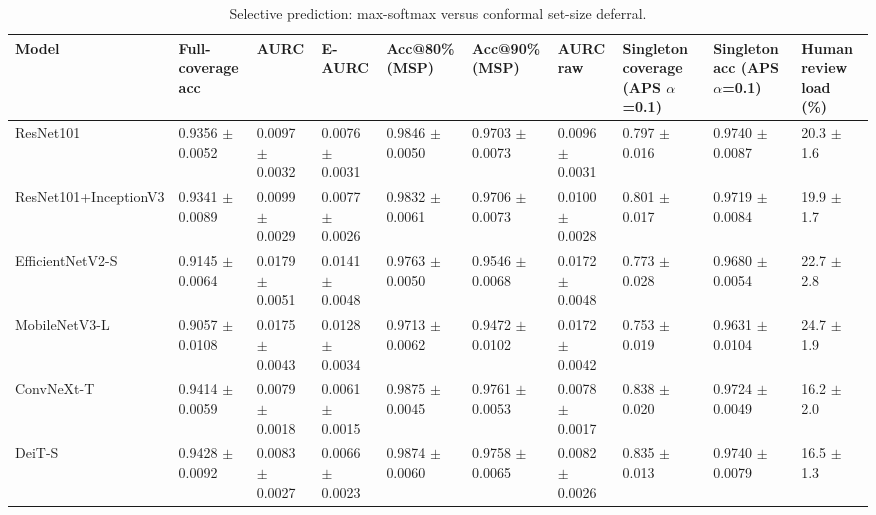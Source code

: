 \begin{table}[ht]
\centering
\small
\caption{Selective prediction: max-softmax versus conformal set-size deferral.}
\label{tab:tab6_selective_prediction}
\begin{tabular}{llllllllll}
\hline
Model & Full-coverage acc & AURC & E-AURC & Acc@80\% (MSP) & Acc@90\% (MSP) & AURC raw & Singleton coverage (APS $\alpha$=0.1) & Singleton acc (APS $\alpha$=0.1) & Human review load (\%) \\
\hline
ResNet101 & 0.9356 $\pm$ 0.0052 & 0.0097 $\pm$ 0.0032 & 0.0076 $\pm$ 0.0031 & 0.9846 $\pm$ 0.0050 & 0.9703 $\pm$ 0.0073 & 0.0096 $\pm$ 0.0031 & 0.797 $\pm$ 0.016 & 0.9740 $\pm$ 0.0087 & 20.3 $\pm$ 1.6 \\
ResNet101+InceptionV3 & 0.9341 $\pm$ 0.0089 & 0.0099 $\pm$ 0.0029 & 0.0077 $\pm$ 0.0026 & 0.9832 $\pm$ 0.0061 & 0.9706 $\pm$ 0.0073 & 0.0100 $\pm$ 0.0028 & 0.801 $\pm$ 0.017 & 0.9719 $\pm$ 0.0084 & 19.9 $\pm$ 1.7 \\
EfficientNetV2-S & 0.9145 $\pm$ 0.0064 & 0.0179 $\pm$ 0.0051 & 0.0141 $\pm$ 0.0048 & 0.9763 $\pm$ 0.0050 & 0.9546 $\pm$ 0.0068 & 0.0172 $\pm$ 0.0048 & 0.773 $\pm$ 0.028 & 0.9680 $\pm$ 0.0054 & 22.7 $\pm$ 2.8 \\
MobileNetV3-L & 0.9057 $\pm$ 0.0108 & 0.0175 $\pm$ 0.0043 & 0.0128 $\pm$ 0.0034 & 0.9713 $\pm$ 0.0062 & 0.9472 $\pm$ 0.0102 & 0.0172 $\pm$ 0.0042 & 0.753 $\pm$ 0.019 & 0.9631 $\pm$ 0.0104 & 24.7 $\pm$ 1.9 \\
ConvNeXt-T & 0.9414 $\pm$ 0.0059 & 0.0079 $\pm$ 0.0018 & 0.0061 $\pm$ 0.0015 & 0.9875 $\pm$ 0.0045 & 0.9761 $\pm$ 0.0053 & 0.0078 $\pm$ 0.0017 & 0.838 $\pm$ 0.020 & 0.9724 $\pm$ 0.0049 & 16.2 $\pm$ 2.0 \\
DeiT-S & 0.9428 $\pm$ 0.0092 & 0.0083 $\pm$ 0.0027 & 0.0066 $\pm$ 0.0023 & 0.9874 $\pm$ 0.0060 & 0.9758 $\pm$ 0.0065 & 0.0082 $\pm$ 0.0026 & 0.835 $\pm$ 0.013 & 0.9740 $\pm$ 0.0079 & 16.5 $\pm$ 1.3 \\
\hline
\end{tabular}
\end{table}